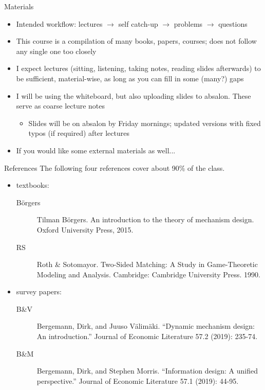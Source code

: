 \documentclass[english,10pt
,aspectratio=169
]{beamer}
\begin{document}
\begin{frame}{Materials}
	\begin{itemize}
		\item Intended workflow: lectures $\to$ self catch-up $\to$ problems $\to$ questions
		\pause
		\item This course is a compilation of many books, papers, courses; does not follow any single one too closely
		\item I expect lectures (sitting, listening, taking notes, reading slides afterwards) to be sufficient, material-wise, as long as you can fill in some (many?) gaps
		\item I will be using the whiteboard, but also uploading slides to absalon. These serve as coarse lecture notes
		\begin{itemize}
			\item Slides will be on absalon by Friday mornings; updated versions with fixed typos (if required) after lectures
		\end{itemize}
		\item If you would like some external materials as well...
	\end{itemize}
\end{frame}


\begin{frame}{References}
	The following four references cover about 90\% of the class.
	\begin{itemize}
		\item textbooks:
		\begin{description}
			\item[B\"{o}rgers] Tilman B\"{o}rgers. An introduction to the theory of mechanism design. Oxford University Press, 2015.
			\item[RS] Roth \& Sotomayor. Two-Sided Matching: A Study in Game-Theoretic Modeling and Analysis. Cambridge: Cambridge University Press. 1990.
		\end{description}
		\item survey papers:
		\begin{description}
			\item[B\&V] Bergemann, Dirk, and Juuso Välimäki. ``Dynamic mechanism design: An introduction.'' Journal of Economic Literature 57.2 (2019): 235-74.
			\item[B\&M] Bergemann, Dirk, and Stephen Morris. ``Information design: A unified perspective.'' Journal of Economic Literature 57.1 (2019): 44-95. 
		\end{description}
	\end{itemize}
\end{frame}
\end{document}
